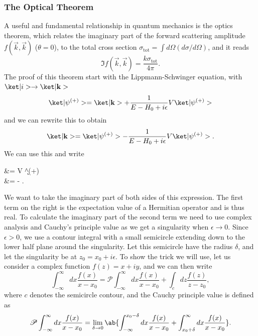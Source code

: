 \subsubsection{The Optical Theorem}
A useful and fundamental relationship in quantum mechanics is the optics theorem, which relates the imaginary part of the forward scattering amplitude $f(\vec{k},\vec{k})$ ($\theta = 0$), to the total cross section $\sigma_\text{tot} = \int d\Omega (d\sigma / d\Omega)$, and it reads
\begin{equation}
    \Im f(\vec{k},\vec{k}) = \frac{k \sigma_\text{tot}}{4\pi}.
\end{equation}
The proof of this theorem start with the Lippmann-Schwinger equation, with $\k{i} \to \k{\vec{k}}$
\begin{equation}
    \k{\psi^{(+)}} = \k{\vec{k}} + \frac{1}{E - H_0 + i \epsilon} V \k{\psi^{(+)}}
\end{equation}
and we can rewrite this to obtain
\begin{equation}
    \k{\vec{k}} =  \k{\psi^{(+)}} - \frac{1}{E - H_0 + i \epsilon} V \k{\psi^{(+)}}.
\end{equation}
We can use this and write
\begin{alphaAlign}
     &=  V \k{\psi^{(+)}}\\
    &=  - .
\end{alphaAlign}
We want to take the imaginary part of both sides of this expression. The first term on the right is the expectation value of a Hermitian operator and is thus real. To calculate the imaginary part of the second term we need to use complex analysis and Cauchy's principle value as we get a singularity when $\epsilon \to 0$. Since $\epsilon > 0$, we use a contour integral with a small semicircle extending down to the lower half plane around the singularity. Let this semicircle have the radius $\delta$, and let the singularity be at $z_0 = x_0 + i\epsilon$. To show the trick we will use, let us consider a complex function $f(z)= x + iy$, and we can then write
\begin{equation}
    \int_{-\infty}^{\infty} dx \frac{f(x)}{x-x_0} = \mathscr{P} \int_{-\infty}^{\infty} dx \frac{f(x)}{x-x_0} + \int_c dz \frac{f(z)}{z-z_0},
\end{equation}
where $c$ denotes the semicircle contour, and the Cauchy principle value is defined as
\begin{equation}
    \mathscr{P} \int_{-\infty}^{\infty} dx \frac{f(x)}{x-x_0} = \lim_{\delta \to 0} \ab\{ \int_{-\infty}^{x_0 - \delta} dx \frac{f(x)}{x-x_0}  + \int_{x_0 + \delta}^{\infty}dx \frac{f(x)}{x-x_0}\}.
\end{equation}
